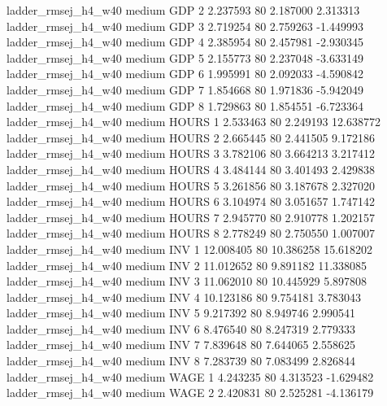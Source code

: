 ladder_rmsej_h4_w40     medium      GDP                 2  2.237593 80       2.187000           2.313313
ladder_rmsej_h4_w40     medium      GDP                 3  2.719254 80       2.759263          -1.449993
ladder_rmsej_h4_w40     medium      GDP                 4  2.385954 80       2.457981          -2.930345
ladder_rmsej_h4_w40     medium      GDP                 5  2.155773 80       2.237048          -3.633149
ladder_rmsej_h4_w40     medium      GDP                 6  1.995991 80       2.092033          -4.590842
ladder_rmsej_h4_w40     medium      GDP                 7  1.854668 80       1.971836          -5.942049
ladder_rmsej_h4_w40     medium      GDP                 8  1.729863 80       1.854551          -6.723364
ladder_rmsej_h4_w40     medium    HOURS                 1  2.533463 80       2.249193          12.638772
ladder_rmsej_h4_w40     medium    HOURS                 2  2.665445 80       2.441505           9.172186
ladder_rmsej_h4_w40     medium    HOURS                 3  3.782106 80       3.664213           3.217412
ladder_rmsej_h4_w40     medium    HOURS                 4  3.484144 80       3.401493           2.429838
ladder_rmsej_h4_w40     medium    HOURS                 5  3.261856 80       3.187678           2.327020
ladder_rmsej_h4_w40     medium    HOURS                 6  3.104974 80       3.051657           1.747142
ladder_rmsej_h4_w40     medium    HOURS                 7  2.945770 80       2.910778           1.202157
ladder_rmsej_h4_w40     medium    HOURS                 8  2.778249 80       2.750550           1.007007
ladder_rmsej_h4_w40     medium      INV                 1 12.008405 80      10.386258          15.618202
ladder_rmsej_h4_w40     medium      INV                 2 11.012652 80       9.891182          11.338085
ladder_rmsej_h4_w40     medium      INV                 3 11.062010 80      10.445929           5.897808
ladder_rmsej_h4_w40     medium      INV                 4 10.123186 80       9.754181           3.783043
ladder_rmsej_h4_w40     medium      INV                 5  9.217392 80       8.949746           2.990541
ladder_rmsej_h4_w40     medium      INV                 6  8.476540 80       8.247319           2.779333
ladder_rmsej_h4_w40     medium      INV                 7  7.839648 80       7.644065           2.558625
ladder_rmsej_h4_w40     medium      INV                 8  7.283739 80       7.083499           2.826844
ladder_rmsej_h4_w40     medium     WAGE                 1  4.243235 80       4.313523          -1.629482
ladder_rmsej_h4_w40     medium     WAGE                 2  2.420831 80       2.525281          -4.136179

